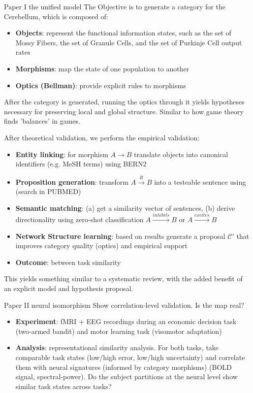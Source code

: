 \documentclass[aspectratio=169]{beamer}
\begin{document}
	\begin{frame} {Paper I the unified model}
		The Objective is to generate a category for the Cerebellum, which is composed of:
		\begin{itemize}
			\item \textbf{Objects}: represent the functional information states, such as the set of Mossy Fibers, the set of Granule Cells, and the set of Purkinje Cell output rates
			\item \textbf{Morphisms}: map the state of one population to another
			\item \textbf{Optics (Bellman)}: provide explicit rules to morphisms
		\end{itemize}
		After the category is generated, running the optics through it yields hypotheses necessary for preserving local and global structure. Similar to how game theory finds 'balances' in games.
	\end{frame}
	
	\begin{frame}
		After theoretical validation, we perform the empirical validation:
		\begin{itemize}
			\item \textbf{Entity linking}: for morphism $A \rightarrow B$ translate objects into canonical identifiers (e.g. MeSH terms) using BERN2
			\item \textbf{Proposition generation}: transform $A \xrightarrow{R} B$ into a testeable sentence using (search in PUBMED)
			\item \textbf{Semantic matching}: (a) get a similarity vector of sentences, (b) derive directionality using zero-shot classification $A \xrightarrow{inhibits} B$ or $A \xrightarrow{excites} B$
			\item \textbf{Network Structure learning}: based on results generate a proposal $\mathcal{C'}$ that improves category quality (optics) and empirical support
			\item \textbf{Outcome}: between task similarity
		\end{itemize}
		
		This yields something similar to a systematic review, with the added benefit of an explicit model and hypothesis proposal.
	\end{frame}
	
	\begin{frame}{Paper II neural isomorphism}
		Show correlation-level validation. Is the map real?
		\begin{itemize}
			\item \textbf{Experiment}: fMRI + EEG recordings during an economic decision task (two-armed bandit) and motor learning task (visomotor adaptation)
			\item \textbf{Analysis}: representational similarity analysis. For both tasks, take comparable task states (low/high error, low/high uncertainty) and correlate them with neural signatures (informed by category morphisms) (BOLD signal, spectral-power). Do the subject partitions at the neural level show similar task states across tasks?
		\end{itemize}
	\end{frame}
	
\end{document}
